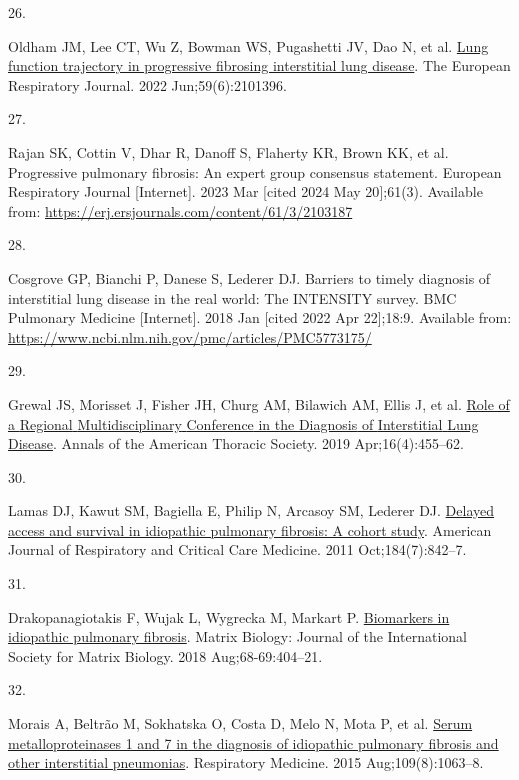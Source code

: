 \documentclass[
]{article}
\newlength{\cslhangindent}
\newlength{\csllabelwidth}
\newlength{\cslentryspacingunit} %
\newenvironment{CSLReferences}[2] %
 {%
  \setlength{\parindent}{0pt}
  \ifodd #1
  \let\oldpar\par
  \def\par{\hangindent=\cslhangindent\oldpar}
  \fi
  \setlength{\parskip}{#2\cslentryspacingunit}
 }%
 {}
\newcommand{\CSLLeftMargin}[1]{\parbox[t]{\csllabelwidth}{#1}}
\newcommand{\CSLRightInline}[1]{\parbox[t]{\linewidth - \csllabelwidth}{#1}\break}
\begin{document}
\begin{CSLReferences}{0}{0}
\leavevmode{}%
\CSLLeftMargin{26. }%
\CSLRightInline{Oldham JM, Lee CT, Wu Z, Bowman WS, Pugashetti JV, Dao N, et al. \href{https://doi.org/10.1183/13993003.01396-2021}{Lung function trajectory in progressive fibrosing interstitial lung disease}. The European Respiratory Journal. 2022 Jun;59(6):2101396. }

\leavevmode{}%
\CSLLeftMargin{27. }%
\CSLRightInline{Rajan SK, Cottin V, Dhar R, Danoff S, Flaherty KR, Brown KK, et al. Progressive pulmonary fibrosis: An expert group consensus statement. European Respiratory Journal {[}Internet{]}. 2023 Mar {[}cited 2024 May 20{]};61(3). Available from: \url{https://erj.ersjournals.com/content/61/3/2103187}}

\leavevmode{}%
\CSLLeftMargin{28. }%
\CSLRightInline{Cosgrove GP, Bianchi P, Danese S, Lederer DJ. Barriers to timely diagnosis of interstitial lung disease in the real world: The {INTENSITY} survey. BMC Pulmonary Medicine {[}Internet{]}. 2018 Jan {[}cited 2022 Apr 22{]};18:9. Available from: \url{https://www.ncbi.nlm.nih.gov/pmc/articles/PMC5773175/}}

\leavevmode{}%
\CSLLeftMargin{29. }%
\CSLRightInline{Grewal JS, Morisset J, Fisher JH, Churg AM, Bilawich AM, Ellis J, et al. \href{https://doi.org/10.1513/AnnalsATS.201811-794OC}{Role of a {Regional} {Multidisciplinary} {Conference} in the {Diagnosis} of {Interstitial} {Lung} {Disease}}. Annals of the American Thoracic Society. 2019 Apr;16(4):455--62. }

\leavevmode{}%
\CSLLeftMargin{30. }%
\CSLRightInline{Lamas DJ, Kawut SM, Bagiella E, Philip N, Arcasoy SM, Lederer DJ. \href{https://doi.org/10.1164/rccm.201104-0668OC}{Delayed access and survival in idiopathic pulmonary fibrosis: A cohort study}. American Journal of Respiratory and Critical Care Medicine. 2011 Oct;184(7):842--7. }

\leavevmode{}%
\CSLLeftMargin{31. }%
\CSLRightInline{Drakopanagiotakis F, Wujak L, Wygrecka M, Markart P. \href{https://doi.org/10.1016/j.matbio.2018.01.023}{Biomarkers in idiopathic pulmonary fibrosis}. Matrix Biology: Journal of the International Society for Matrix Biology. 2018 Aug;68-69:404--21. }

\leavevmode{}%
\CSLLeftMargin{32. }%
\CSLRightInline{Morais A, Beltrão M, Sokhatska O, Costa D, Melo N, Mota P, et al. \href{https://doi.org/10.1016/j.rmed.2015.06.003}{Serum metalloproteinases 1 and 7 in the diagnosis of idiopathic pulmonary fibrosis and other interstitial pneumonias}. Respiratory Medicine. 2015 Aug;109(8):1063--8. }


\end{CSLReferences}
\end{document}
